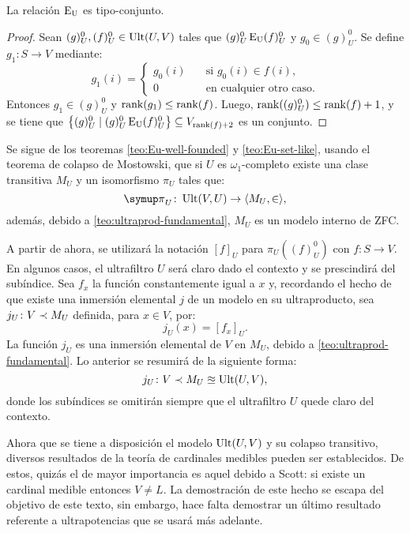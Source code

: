 \begin{teo}\label{teo:Eu-set-like}
    La relación $\operatorname{E_U}$ es tipo-conjunto.
\end{teo}
\begin{proof}
    \def\Ou{^0_U}
    Sean $(g)\Ou, (f)\Ou\in \Ult(U,V)$ tales que $(g)\Ou \Eu (f)\Ou$ y $g_0\in(g)\Ou$.
    Se define $g_1\colon S\to V$ mediante:
    \[
        g_1(i) =
        \begin{cases}
          g_0(i)\quad & \text{si $g_0(i)\in f(i)$,}\\
          0\quad & \text{en cualquier otro caso.}
        \end{cases}
    \]
    Entonces $g_1\in (g)\Ou$ y $\operatorname{rank}(g_1)\leq\operatorname{rank}(f)$. Luego, $\rank((g)\Ou)\leq\rank(f)+1$,
    y se tiene que $\set{(g)\Ou\mid (g)\Ou\Eu (f)\Ou}\subseteq V_{\rank(f)+2}$ es un conjunto.
\end{proof}

Se sigue de los teoremas \ref{teo:Eu-well-founded} y \ref{teo:Eu-set-like},
usando el teorema de colapso de Mostowski, que si $U$ es $\omega_1$-completo
existe una clase transitiva $M_U$ y un isomorfismo $\pi_U$ tales que:
\[
    \pi_U\colon\Ult(V,U)\to\op{M_U,\in},
\]
además, debido a \ref{teo:ultraprod-fundamental}, $M_U$ es un modelo interno
de ZFC.

A partir de ahora, se utilizará la notación $[f]_U$ para $\pi_U((f)_U^0)$
con $f\colon S\to V$. En algunos casos, el ultrafiltro $U$ será claro dado el contexto
y se prescindirá del subíndice. Sea $f_x$ la función constantemente igual a $x$ y,
recordando el hecho de que existe una inmersión elemental $j$ de un modelo en su ultraproducto,
sea $j_U\colon V\prec M_U$ definida, para $x\in V$, por:
\[
    j_U(x) = [f_x]_U.
\]
La función $j_U$ es una inmersión elemental de $V$ en $M_U$, debido a \ref{teo:ultraprod-fundamental}.
Lo anterior se resumirá de la siguiente forma:
\[
    j_U\colon V\prec M_U\approxeq\operatorname{Ult}(U,V),
\]
donde los subíndices se omitirán siempre que el ultrafiltro $U$ quede claro
del contexto.

Ahora que se tiene a disposición el modelo $\operatorname{Ult}(U,V)$ y su colapso transitivo,
diversos resultados de la teoría de cardinales medibles pueden ser establecidos.
De estos, quizás el de mayor importancia es aquel debido a Scott: si existe
un cardinal medible entonces $V\neq L$. La demostración de este hecho se
escapa del objetivo de este texto, sin embargo, hace falta demostrar un
último resultado referente a ultrapotencias que se usará más adelante.

